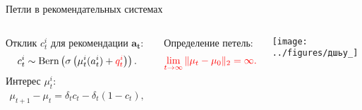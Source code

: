 \documentclass{beamer}
\begin{document}
\begin{frame}
\thispagestyle{empty}
\maketitle
\end{frame}

\begin{frame}{Петли в рекомендательных системах}

\begin{columns}[c]
Отклик $c_t^i$ для рекомендации $\mathbf{a_t}$:
\begin{gather*}
    c_t^i \sim \text{Bern} \left(\sigma\left(\mu_t^i (a_t^i) + \mathbin{\color{red} q_t^i } \right) \right). 
\end{gather*}
Интерес $\mu_t^i$:
\begin{gather*}
    \mu_{t+1} - \mu_{t} = \delta_t c_t - \delta_t (1 - c_t),\\ 
\end{gather*}

Определение петель: 
\begin{gather*}
  \color{red} \lim_{t \to \infty} \|\mu_t - \mu_0 \|_2 = \infty.
\end{gather*}






\texttt{[image: ../figures/дшьу\_]}
\end{columns}
\end{frame}
\end{document}
